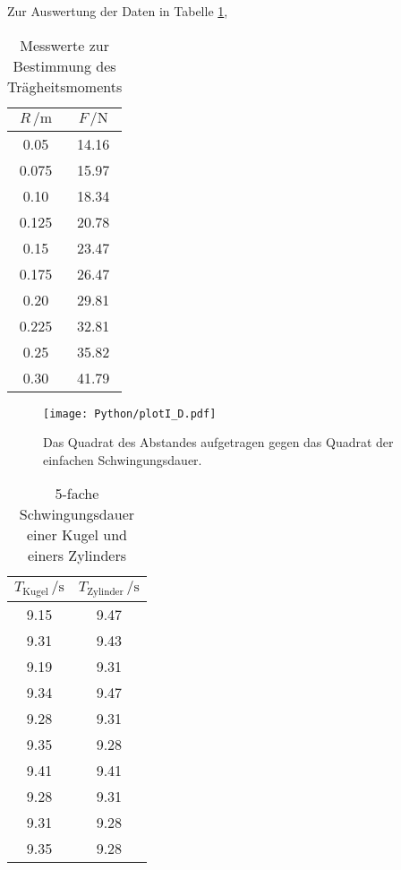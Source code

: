 Zur Auswertung der Daten in Tabelle \ref{tab:Traegheitsmoment},

\begin{table}[H]
  \centering
  \caption{Messwerte zur Bestimmung des Trägheitsmoments}
  \label{tab:Traegheitsmoment}
  \begin{tabular}{
  c c
  }
    \toprule
     $R \, / \unit{\meter}$ & $F\, / \unit{\newton}$\\
    \midrule
    0.05  & 14.16 \\
    0.075 & 15.97 \\
    0.10  & 18.34 \\
    0.125 & 20.78 \\
    0.15  & 23.47 \\
    0.175 & 26.47 \\
    0.20  & 29.81 \\
    0.225 & 32.81 \\
    0.25  & 35.82 \\
    0.30  & 41.79 \\
    \bottomrule
  \end{tabular}
\end{table}
\begin{figure}[H]
  \centering
  \texttt{[image: Python/plotI\_D.pdf]}
  \caption{Das Quadrat des Abstandes aufgetragen gegen das Quadrat der einfachen Schwingungsdauer.}
  \label{fig:Plot1}
\end{figure}



\begin{table}[H]
  \centering
  \caption{5-fache Schwingungsdauer einer Kugel und einers Zylinders}
  \label{tab:Kugel_Zylinder}
  \begin{tabular}{
  c c
  }
    \toprule
     $T_\text{Kugel}\, / \unit{\second}$ & $T_\text{Zylinder}\, / \unit{\second}$\\
    \midrule
    9.15 & 9.47 \\
    9.31 & 9.43 \\
    9.19 & 9.31 \\
    9.34 & 9.47 \\
    9.28 & 9.31 \\
    9.35 & 9.28 \\
    9.41 & 9.41 \\
    9.28 & 9.31 \\
    9.31 & 9.28 \\
    9.35 & 9.28 \\
    \bottomrule
  \end{tabular}
\end{table}
